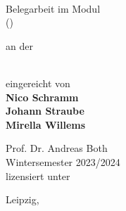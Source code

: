 
\begin{titlepage}

    \begin{figure}[!tbp]
        \centering
    \end{figure}

    \begin{center} \large

        \vspace*{1.5cm}
        
        \begin{minipage}{0.6\textwidth}
            \centering
            {\Huge \textbf{
                \papertitle\\
            }}
        \end{minipage}

        \vspace*{1.5cm}

        Belegarbeit im Modul\\
        \emph{\module} (\modulenumber)

        \vspace*{0.5cm}

        an der\\
        \universityname\\
        \facultyname

        \vspace*{1.5cm}
        
        eingereicht von \\
        \vspace*{0.2cm}
        {\Large \textbf{
            Nico Schramm\\
            Johann Straube\\
            Mirella Willems\\
        }}
          
        \vfill

        Prof. Dr. Andreas Both\\
        Wintersemester 2023/2024\\
        lizensiert unter \license

        \vspace*{1cm}

        Leipzig, \dateofsubmission
    \end{center}

\end{titlepage}
